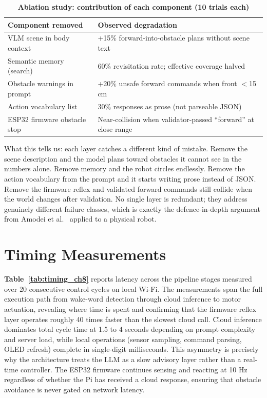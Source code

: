 \begin{table}[H]
\centering
\caption[Ablation study: contribution of each component (10 trials each)]{\textbf{Ablation study: contribution of each component (10 trials each)}}
\label{tab:ablation_ch8}
\begin{tabularx}{\textwidth}{|>{\raggedright\arraybackslash}p{3.8cm}|X|}
\hline
\textbf{Component removed} & \textbf{Observed degradation} \\
\hline
VLM scene in body context & +15\% forward-into-obstacle plans without scene text \\
\hline
Semantic memory (search) & 60\% revisitation rate; effective coverage halved \\
\hline
Obstacle warnings in prompt & +20\% unsafe forward commands when front $<$15\,cm \\
\hline
Action vocabulary list & 30\% responses as prose (not parseable JSON) \\
\hline
ESP32 firmware obstacle stop & Near-collision when validator-passed ``forward'' at close range \\
\hline
\end{tabularx}
\end{table}

What this tells us: each layer catches a different kind of mistake. Remove the scene description and the model plans toward obstacles it cannot see in the numbers alone. Remove memory and the robot circles endlessly. Remove the action vocabulary from the prompt and it starts writing prose instead of JSON. Remove the firmware reflex and validated forward commands still collide when the world changes after validation. No single layer is redundant; they address genuinely different failure classes, which is exactly the defence-in-depth argument from Amodei et al.~\cite{amodei2016safety} applied to a physical robot.

\section{Timing Measurements}
\label{sec:timing_results}

\textbf{Table~\ref{tab:timing_ch8}} reports latency across the pipeline stages measured over 20 consecutive control cycles on local Wi-Fi. The measurements span the full execution path from wake-word detection through cloud inference to motor actuation, revealing where time is spent and confirming that the firmware reflex layer operates roughly 40 times faster than the slowest cloud call. Cloud inference dominates total cycle time at 1.5 to 4 seconds depending on prompt complexity and server load, while local operations (sensor sampling, command parsing, OLED refresh) complete in single-digit milliseconds. This asymmetry is precisely why the architecture treats the LLM as a slow advisory layer rather than a real-time controller. The ESP32 firmware continues sensing and reacting at 10 Hz regardless of whether the Pi has received a cloud response, ensuring that obstacle avoidance is never gated on network latency.


